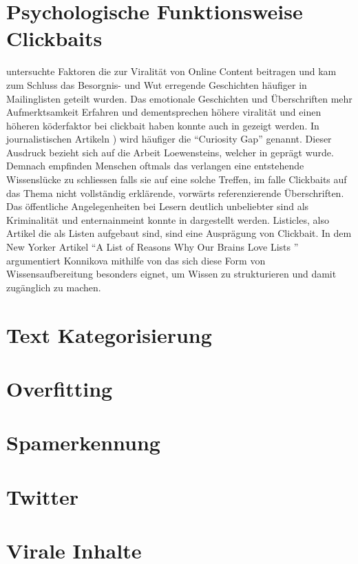 \section{Psychologische Funktionsweise Clickbaits} %
\label{sub:psycho}
\cite{berger2012makes} untersuchte Faktoren die zur Viralität von Online Content beitragen und kam zum Schluss das Besorgnis- und Wut erregende Geschichten häufiger in Mailinglisten geteilt wurden.  
Das emotionale Geschichten und Überschriften mehr Aufmerktsamkeit Erfahren und dementsprechen höhere viralität und einen höheren köderfaktor bei clickbait haben konnte auch in \cite{guerini2015deep} gezeigt werden.
In journalistischen Artikeln \cite{site:psycholicalreasonsclickbait}) wird häufiger die \enquote{Curiosity Gap} genannt. Dieser Ausdruck bezieht sich auf die Arbeit Loewensteins, welcher in \cite{loewenstein1994psychology} geprägt wurde. Demnach empfinden Menschen oftmals das verlangen eine entstehende Wissenslücke zu schliessen falls sie auf eine solche Treffen, im falle Clickbaits auf das Thema nicht vollständig erklärende, vorwärts referenzierende Überschriften.
Das öffentliche Angelegenheiten bei Lesern deutlich unbeliebter sind als Kriminalität und enternainmeint konnte in \cite{hensinger2013modelling} dargestellt werden.
Listicles, also Artikel die als Listen aufgebaut sind, sind eine Ausprägung von Clickbait. In dem New Yorker Artikel \enquote{A List of Reasons Why Our Brains Love Lists
} argumentiert Konnikova mithilfe von \cite{messner2011unconscious} das sich diese Form von Wissensaufbereitung besonders eignet, um Wissen zu strukturieren und damit zugänglich zu machen. 
\cite{ifantidou2009newspaper}

\section{Text Kategorisierung} %
\label{sub:text_kategorisierung}

\section{Overfitting} %
\label{sub:overfitting}

\cite{aphinyanaphongs2014comprehensive}
\section{Spamerkennung} %
\label{sub:spamerkennung}

\section{Twitter} %
\label{sub:twitter}

\cite{mccord2011spam}
\cite{benevenuto2010detecting}
\cite{kouloumpis2011twitter}
\section{Virale Inhalte} %
\label{sub:virale_inhalte}
\cite{berger2012makes}

